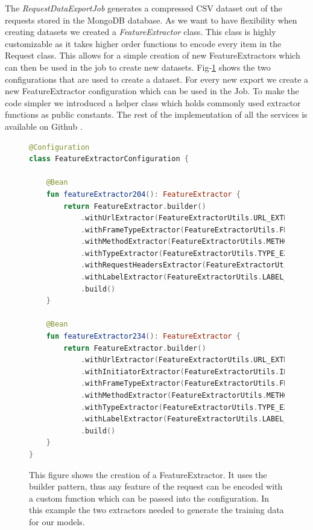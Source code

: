 The \emph{RequestDataExportJob} generates a compressed CSV dataset out of the requests stored in the MongoDB database. As we want 
to have flexibility when creating datasets we created a \emph{FeatureExtractor} class. This class is highly customizable as it
takes higher order functions
to encode every item in the Request class. This allows for a simple creation of new FeatureExtractors which can then be used in the job to create new datasets.
Fig-\ref{fig:Feature} shows the two configurations that are used to create a dataset. For every new export we
create a new FeatureExtractor configuration which can be used in the Job. To make the code simpler we introduced a helper class which 
holds commonly used extractor functions as public constants. The rest of the implementation of all the services is available on Github \cite{trackingDetectorInfra}.
\begin{figure}[ht!]
\begin{lstlisting}[language=Kotlin]
@Configuration
class FeatureExtractorConfiguration {

    @Bean
    fun featureExtractor204(): FeatureExtractor {
        return FeatureExtractor.builder()
            .withUrlExtractor(FeatureExtractorUtils.URL_EXTRACTOR)
            .withFrameTypeExtractor(FeatureExtractorUtils.FRAME_TYPE_EXTRACTOR)
            .withMethodExtractor(FeatureExtractorUtils.METHOD_EXTRACTOR)
            .withTypeExtractor(FeatureExtractorUtils.TYPE_EXTRACTOR)
            .withRequestHeadersExtractor(FeatureExtractorUtils.REQUEST_HEADER_REFERER)
            .withLabelExtractor(FeatureExtractorUtils.LABEL_EXTRACTOR)
            .build()
    }

    @Bean
    fun featureExtractor234(): FeatureExtractor {
        return FeatureExtractor.builder()
            .withUrlExtractor(FeatureExtractorUtils.URL_EXTRACTOR)
            .withInitiatorExtractor(FeatureExtractorUtils.INITIATOR_EXTRACTOR)
            .withFrameTypeExtractor(FeatureExtractorUtils.FRAME_TYPE_EXTRACTOR)
            .withMethodExtractor(FeatureExtractorUtils.METHOD_EXTRACTOR)
            .withTypeExtractor(FeatureExtractorUtils.TYPE_EXTRACTOR)
            .withLabelExtractor(FeatureExtractorUtils.LABEL_EXTRACTOR)
            .build()
    }
}
\end{lstlisting}
\caption{This figure shows the creation of a FeatureExtractor. It uses the builder pattern, thus any feature of 
the request can be encoded with a custom function which can be passed into the configuration. In this example the two extractors needed
to generate the training data for our models.}
\label{fig:Feature}
\end{figure}


